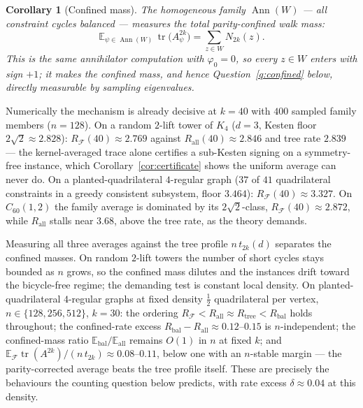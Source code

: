 \documentclass[11pt]{article}
\newtheorem{corollary}[lemma]{Corollary}
\theoremstyle{remark}
\DeclareMathOperator{\tr}{tr}
\begin{document}
\begin{corollary}[Confined mass]\label{cor:balanced}
The homogeneous family $\operatorname{Ann}(W)$ --- all constraint cycles
\emph{balanced} --- measures the total parity-confined walk mass:
\[
\mathbb E_{\psi\in\operatorname{Ann}(W)}\,\tr\!\big(A_\psi^{2k}\big)
=\sum_{z\in W}N_{2k}(z).
\]
This is the same annihilator computation with $\varphi_0=0$, so every
$z\in W$ enters with sign $+1$; it makes the confined mass, and hence
Question~\ref{q:confined} below, directly measurable by sampling
eigenvalues.
\end{corollary}

Numerically the mechanism is already decisive at $k=40$ with $400$
sampled family members ($n=128$). On a random $2$-lift tower of $K_4$
($d=3$, Kesten floor $2\sqrt2\approx2.828$):
$R_{\mathcal F}(40)\approx2.769$ against
$R_{\mathrm{all}}(40)\approx2.846$ and tree rate $2.839$ --- the
kernel-averaged trace alone certifies a sub-Kesten signing on a
symmetry-free instance, which Corollary~\ref{cor:certificate} shows the
uniform average can never do. On a planted-quadrilateral $4$-regular graph ($37$ of $41$
quadrilateral constraints in a greedy consistent subsystem, floor
$3.464$):
$R_{\mathcal F}(40)\approx3.327$. On $C_{60}(1,2)$ the family average is
dominated by its $2\sqrt2$-class, $R_{\mathcal F}(40)\approx2.872$,
while $R_{\mathrm{all}}$ stalls near $3.68$, above the tree rate, as the
theory demands.

Measuring all three averages against the tree profile $n\,t_{2k}(d)$
separates the confined masses. On random $2$-lift towers the number of
short cycles stays bounded as $n$ grows, so the confined mass dilutes
and the instances drift toward the bicycle-free regime; the demanding
test is constant local density. On planted-quadrilateral $4$-regular
graphs at fixed density $\tfrac12$ quadrilateral per vertex,
$n\in\{128,256,512\}$, $k=30$: the ordering
$R_{\mathcal F}<R_{\mathrm{all}}\approx R_{\mathrm{tree}}<
R_{\mathrm{bal}}$ holds throughout; the confined-rate excess
$R_{\mathrm{bal}}-R_{\mathrm{all}}\approx0.12$--$0.15$ is
$n$-independent; the confined-mass ratio
$\mathbb E_{\mathrm{bal}}/\mathbb E_{\mathrm{all}}$ remains $O(1)$ in
$n$ at fixed $k$; and
$\mathbb E_{\mathcal F}\tr(A^{2k})/(n\,t_{2k})\approx0.08$--$0.11$,
below one with an $n$-stable margin --- the parity-corrected average
beats the tree profile itself. These are precisely the behaviours the
counting question below predicts, with rate excess $\delta\approx0.04$
at this density.
\end{document}
